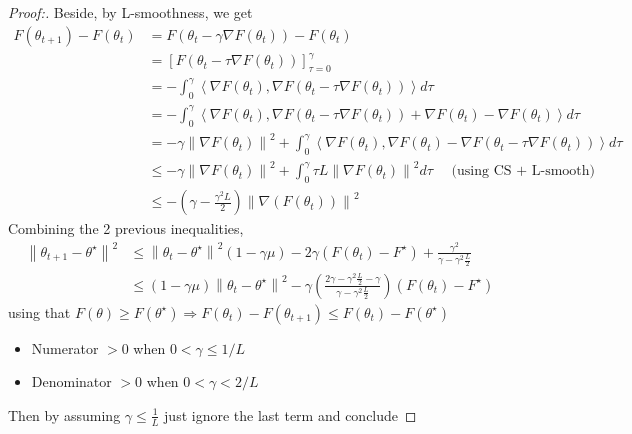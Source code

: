 \begin{note}
\begin{proof}[Proof:]
        Beside, by L-smoothness, we get 
        \begin{align*}
            F(\theta _{t+1}) - F(\theta _t) 
                &= F(\theta _t - \gamma \nabla F(\theta _t)) - F(\theta _t) \\
                &= [F(\theta _t - \tau \nabla F(\theta _t))]^\gamma _{\tau = 0} \\
                &= -\int_{0}^{\gamma } \left\langle \nabla F(\theta _t), \nabla F(\theta _t - \tau \nabla F(\theta _t)) \right\rangle d \tau \\
                &= -\int_{0}^{\gamma } \left\langle \nabla F(\theta _t), \nabla F(\theta _t - \tau \nabla F(\theta _t)) + \nabla F(\theta _t) - \nabla F(\theta _t)\right\rangle d \tau \\
                &= - \gamma \left\| \nabla F(\theta _t) \right\| ^2 + \int_{0}^{\gamma } \left\langle \nabla F(\theta _t), \nabla F(\theta _t) - \nabla F(\theta _t - \tau \nabla F(\theta _t)) \right\rangle d \tau \\
                &\leq - \gamma \left\| \nabla F(\theta _t)  \right\| ^2 + \int_{0}^{\gamma }\tau L \left\| \nabla F(\theta _t) \right\| ^2 d \tau \quad \text{ (using CS + L-smooth)} \\
                &\leq - (\gamma - \frac{\gamma ^2 L}{2}) \left\| \nabla (F(\theta _t )) \right\| ^2 
        \end{align*}
        Combining the 2 previous inequalities, 
        \begin{align*}
            \left\| \theta_{t+1} - \theta ^{\star} \right\|^2 &\leq  \left\| \theta_{t} - \theta ^{\star} \right\|^2 (1 - \gamma \mu ) - 2 \gamma (F(\theta_t) - F^{\star }) + \frac{\gamma ^2 }{\gamma - \gamma^2 \frac{L}{2}} \\
            &\leq (1 - \gamma \mu ) \left\| \theta_t - \theta ^\star  \right\| ^2 - \gamma ( \frac{2 \gamma - \gamma ^2 \frac{L}{2} - \gamma }{\gamma - \gamma ^2 \frac{L}{2}}) ( F(\theta _t ) - F^\star )
        \end{align*}
        using that $ F(\theta ) \geq F(\theta ^\star ) \Rightarrow F(\theta _t) - F(\theta _{t+1}) \leq F(\theta _t) - F(\theta ^\star ) $  
        \begin{itemize}
            \item Numerator $ > 0 $  when $ 0 < \gamma \leq 1/L $ 
            \item Denominator $ > 0 $  when $ 0 < \gamma < 2/L $ 
        \end{itemize}
        Then by assuming $ \gamma \leq \frac{1}{L} $ just ignore the last term and conclude
    \end{proof}
\end{note}



